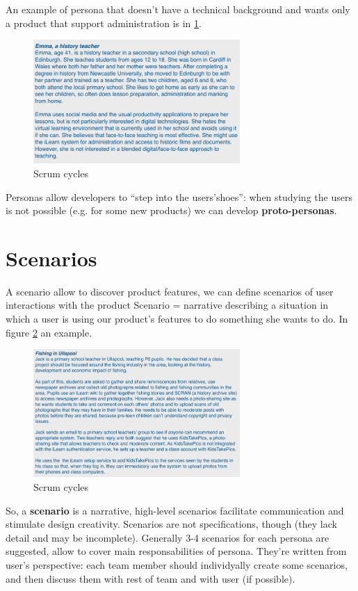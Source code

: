 \documentclass[10pt,a4paper]{report}
\begin{document}
An example of persona that doesn't have a technical background and wants only a product that support administration is in \ref{image18}.

\begin{figure}[h]
	\centering
	\includegraphics[width=0.7\textwidth]{image18}
	\caption{Scrum cycles}
	\label{image18}
\end{figure}

Personas allow developers to “step into the users’shoes”: when studying the users is not possible (e.g. for some new products) we can develop \textbf{proto-personas}.

\section{Scenarios}
A scenario allow to discover product features, we can define scenarios of user interactions with the product
Scenario = narrative describing a situation in which a user is using our product’s features to do something she wants to do. 
In figure \ref{image19} an example. 
\begin{figure}[h]
	\centering
	\includegraphics[width=0.7\textwidth]{image19}
	\caption{Scrum cycles}
	\label{image19}
\end{figure}
 So, a \textbf{scenario} is a narrative, high-level scenarios facilitate communication and
 stimulate design creativity. Scenarios are not specifications, though (they lack detail and  may be incomplete). Generally 3-4 scenarios for each persona are suggested, allow to cover main responsabilities of persona. They're written from user's perspective: each team member should individyally create some scenarios, and then discuss them with rest of team and with user (if possible). 
 
\end{document}
